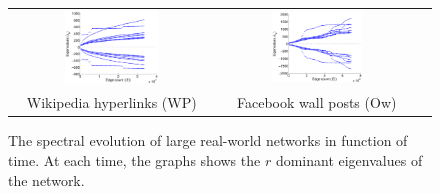 \documentclass[11pt,a4paper]{book}
\newcommand{\wTwo}{0.48}
\newcommand{\syRank}{r}
\begin{document}
\begin{figure}[h!]
  \centering
  \begin{tabular}{ccc}
    \includegraphics[width=\wTwo\textwidth]{img-st/time.spectrum-flat.sym.wikipedia-growth} &
    \includegraphics[width=\wTwo\textwidth]{img-st/time.spectrum-flat.sym.facebook-wosn-wall} \\
    Wikipedia hyperlinks (\textsf{WP}) &
    Facebook wall posts (\textsf{Ow}) 
  \end{tabular}
  \caption{
    The spectral evolution of large real-world networks in function of
    time.  At each time, the graphs shows the $\syRank$ dominant
    eigenvalues of the network.
  }
  \label{fig:spectral-evolution}
\end{figure}
\end{document}
